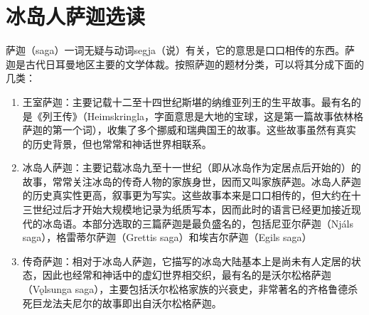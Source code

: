 \chapter{冰岛人萨迦选读}
萨迦（saga）一词无疑与动词segja（说）有关，它的意思是口口相传的东西。萨迦是古代日耳曼地区主要的文学体裁。按照萨迦的题材分类，可以将其分成下面的几类：
\begin{enumerate}
    \item 王室萨迦：主要记载十二至十四世纪斯堪的纳维亚列王的生平故事。最有名的是《列王传》（Heimskringla，字面意思是大地的宝球，这是第一篇故事依林格萨迦的第一个词），收集了多个挪威和瑞典国王的故事。这些故事虽然有真实的历史背景，但也常常和神话世界相联系。

    \item 冰岛人萨迦：主要记载冰岛九至十一世纪（即从冰岛作为定居点后开始的）的故事，常常关注冰岛的传奇人物的家族身世，因而又叫家族萨迦。冰岛人萨迦的历史真实性更高，叙事更为写实。这些故事本来是口口相传的，但大约在十三世纪过后才开始大规模地记录为纸质写本，因而此时的语言已经更加接近现代的冰岛语。本部分选取的三篇萨迦是最负盛名的，包括尼亚尔萨迦（Njáls saga），格雷蒂尔萨迦（Grettis saga）和埃吉尔萨迦（Egils saga）

    \item 传奇萨迦：相对于冰岛人萨迦，它描写的冰岛大陆基本上是尚未有人定居的状态，因此也经常和神话中的虚幻世界相交织，最有名的是沃尔松格萨迦（Vǫlsunga saga），主要包括沃尔松格家族的兴衰史，非常著名的齐格鲁德杀死巨龙法夫尼尔的故事即出自沃尔松格萨迦。
\end{enumerate}

